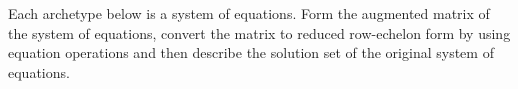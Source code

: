Each archetype below is a system of equations.  Form the augmented matrix of the system of equations, convert the matrix to reduced row-echelon form by using equation operations and then describe the solution set of the original system of equations.\\
\\ 
\\ 
\\ 
\\ 
\\ 
\\ 
\\ 
\\ 
\\
